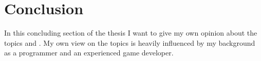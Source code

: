 \chapter{Conclusion}

In this concluding section of the thesis I want to give my own opinion about the
topics \mss{} and \ogs{}. My own view on the topics is heavily influenced by my
background as a programmer and an experienced game developer.









